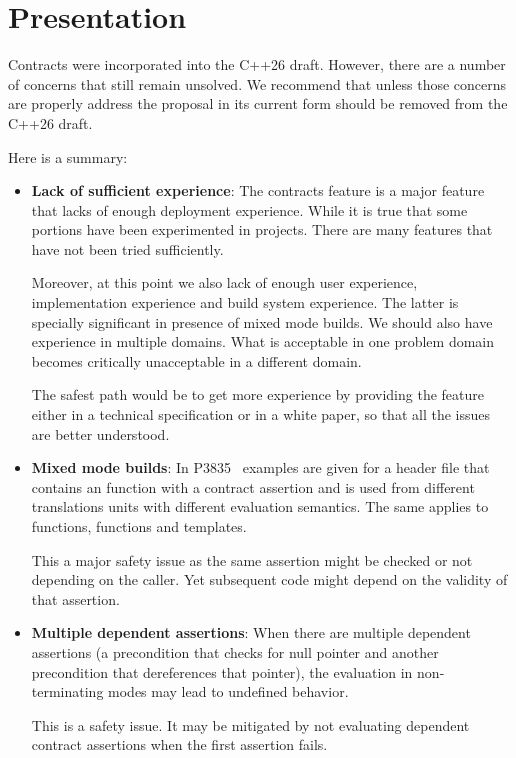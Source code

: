 \section{Presentation}

Contracts were incorporated into the C++26 draft. However, there are a number of
concerns that still remain unsolved. We recommend that unless those concerns are
properly address the proposal in its current form should be removed from the
C++26 draft.

Here is a summary:

\begin{itemize}

\item \textbf{Lack of sufficient experience}: The contracts feature is
a major feature that lacks of enough deployment experience. While it is true
that some portions have been experimented in projects. There are many features
that have not been tried sufficiently.

Moreover, at this point we also lack of enough user experience, implementation
experience and build system experience. The latter is specially significant in
presence of mixed mode builds. We should also have experience in multiple
domains. What is acceptable in one problem domain becomes critically
unacceptable in a different domain.

The safest path would be to get more experience by providing the feature either
in a technical specification or in a white paper, so that all the issues are
better understood.

\item \textbf{Mixed mode builds}: In P3835~\cite{p3835r0} examples are given for
a header file that contains an  function with a contract assertion and is
used from different translations units with different evaluation semantics. The
same applies to  functions,  functions and
templates.

This a major safety issue as the same assertion might be checked or not
depending on the caller. Yet subsequent code might depend on the validity of
that assertion.

\item \textbf{Multiple dependent assertions}: When there are multiple dependent
assertions (a precondition that checks for null pointer and another precondition
that dereferences that pointer), the evaluation in non-terminating modes may
lead to undefined behavior.

This is a safety issue. It may be mitigated by not evaluating dependent contract
assertions when the first assertion fails.


\end{itemize}
